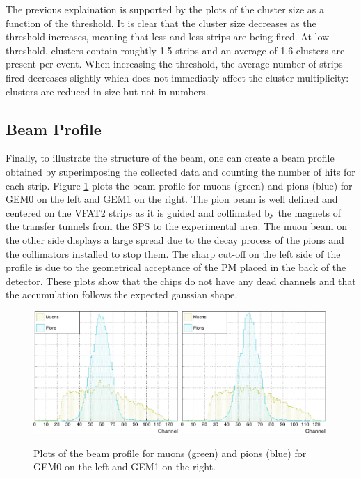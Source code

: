       The previous explaination is supported by the plots of the cluster size as a function of the threshold. It is clear that the cluster size decreases as the threshold increases, meaning that less and less strips are being fired. At low threshold, clusters contain roughtly 1.5 strips and an average of 1.6 clusters are present per event. When increasing the threshold, the average number of strips fired decreases slightly which does not immediatly affect the cluster multiplicity: clusters are reduced in size but not in numbers.

    \subsection{Beam Profile}

      Finally, to illustrate the structure of the beam, one can create a beam profile obtained by superimposing the collected data and counting the number of hits for each strip. Figure \ref{fig:II-3-data-beam-profile} plots the beam profile for muons (green) and pions (blue) for GEM0 on the left and GEM1 on the right. The pion beam is well defined and centered on the VFAT2 strips as it is guided and collimated by the magnets of the transfer tunnels from the SPS to the experimental area. The muon beam on the other side displays a large spread due to the decay process of the pions and the collimators installed to stop them. The sharp cut-off on the left side of the profile is due to the geometrical acceptance of the PM placed in the back of the detector. These plots show that the chips do not have any dead channels and that the accumulation follows the expected gaussian shape.

      \begin{figure}[h!]
        \centering
        \includegraphics[width=0.49\textwidth]{img/plots/cBeamProfile_GEM0-crop}
        \includegraphics[width=0.49\textwidth]{img/plots/cBeamProfile_GEM1-crop}
        \caption{Plots of the beam profile for muons (green) and pions (blue) for GEM0 on the left and GEM1 on the right.}
        \label{fig:II-3-data-beam-profile}
      \end{figure}

